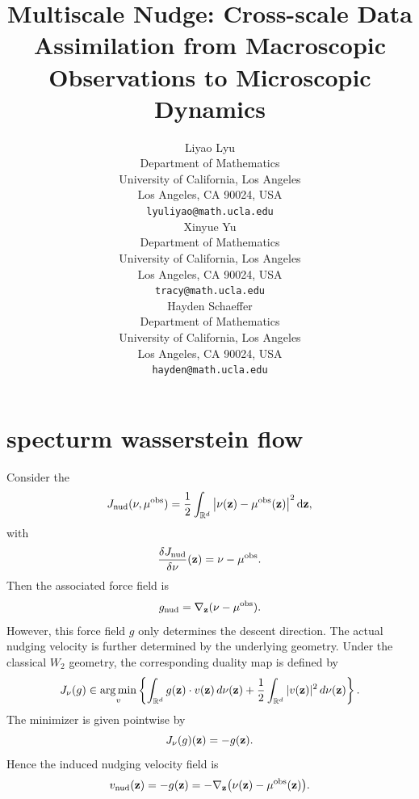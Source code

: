 \documentclass{article}
\title{
Multiscale Nudge: Cross-scale Data Assimilation from Macroscopic Observations to Microscopic Dynamics
}
\author{
  Liyao Lyu\\
  Department of Mathematics \\
  University of California, Los Angeles \\
  Los Angeles, CA 90024, USA\\
  \texttt{lyuliyao@math.ucla.edu} \\
  \AND
   Xinyue Yu \\
  Department of Mathematics \\
  University of California, Los Angeles \\
  Los Angeles, CA 90024, USA\\
  \texttt{tracy@math.ucla.edu} \\
  \AND
   Hayden Schaeffer  \\
  Department of Mathematics \\
  University of California, Los Angeles \\
  Los Angeles, CA 90024, USA\\
  \texttt{hayden@math.ucla.edu} \\
}
\theoremstyle{definition}
\begin{document}
\maketitle
\section{specturm wasserstein flow}
Consider the 
\[
J_{\mathrm{nud}}(\nu,\mu^{\mathrm{obs}}) = \frac{1}{2}\int_{\mathbb{R}^d} \left| \nu(\mathbf{z}) - \mu^{\mathrm{obs}}(\mathbf{z}) \right|^2 \mathrm{d} \mathbf{z},
\]
with 
\[
 \frac{\delta J_{\mathrm{nud}}}{\delta \nu}(\mathbf{z})  = \nu-\mu^\mathrm{obs}.
\]
Then the associated force field is 
\[
g_{\mathrm{nud}} = \nabla_{\mathbf{z}} (\nu-\mu^{\mathrm{obs}}).
\]
However, this force field $g$ only determines the descent direction. The actual nudging velocity is further determined by the underlying geometry. Under the classical $W_2$ geometry, the corresponding duality map is defined by
\[
J_\nu(g)
\in
\operatorname*{arg\,min}_{v}
\left\{
\int_{\mathbb{R}^d} g(\mathbf{z})\cdot v(\mathbf{z})\, d\nu(\mathbf{z})
+
\frac12
\int_{\mathbb{R}^d} |v(\mathbf{z})|^2\, d\nu(\mathbf{z})
\right\}.
\]
The minimizer is given pointwise by
\[
J_\nu(g)(\mathbf{z})=-g(\mathbf{z}).
\]
Hence the induced nudging velocity field is
\[
v_{\mathrm{nud}}(\mathbf{z})
=
-g(\mathbf{z})
=
-\nabla_{\mathbf{z}}\bigl(\nu(\mathbf{z})-\mu^{\mathrm{obs}}(\mathbf{z})\bigr).
\]
\end{document}
